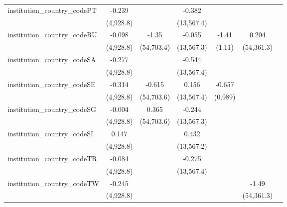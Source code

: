\begin{tabular}{lcccccc}
   institution\_country\_codePT          & -0.239        &             & -0.382        &              &              &   \\   
                                         & (4,928.8)     &             & (13,567.4)    &              &              &   \\   
   institution\_country\_codeRU          & -0.098        & -1.35       & -0.055        & -1.41        & 0.204        &   \\   
                                         & (4,928.8)     & (54,703.4)  & (13,567.3)    & (1.11)       & (54,361.3)   &   \\   
   institution\_country\_codeSA          & -0.277        &             & -0.544        &              &              &   \\   
                                         & (4,928.8)     &             & (13,567.4)    &              &              &   \\   
   institution\_country\_codeSE          & -0.314        & -0.615      & 0.156         & -0.657       &              &   \\   
                                         & (4,928.8)     & (54,703.6)  & (13,567.4)    & (0.989)      &              &   \\   
   institution\_country\_codeSG          & -0.004        & 0.365       & -0.244        &              &              &   \\   
                                         & (4,928.8)     & (54,703.6)  & (13,567.3)    &              &              &   \\   
   institution\_country\_codeSI          & 0.147         &             & 0.432         &              &              &   \\   
                                         & (4,928.8)     &             & (13,567.2)    &              &              &   \\   
   institution\_country\_codeTR          & -0.084        &             & -0.275        &              &              &   \\   
                                         & (4,928.8)     &             & (13,567.4)    &              &              &   \\   
   institution\_country\_codeTW          & -0.245        &             &               &              & -1.49        &   \\   
                                         & (4,928.8)     &             &               &              & (54,361.3)   &   \\   

\end{tabular}
